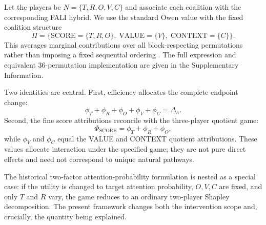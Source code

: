 Let the players be $N=\{T,R,O,V,C\}$ and associate each coalition with the corresponding FALI hybrid. We use the standard Owen value with the fixed coalition structure
\begin{equation}
\Pi=\{\mathrm{SCORE}=\{T,R,O\},\;\mathrm{VALUE}=\{V\},\;\mathrm{CONTEXT}=\{C\}\}.
\label{eq:owen-partition}
\end{equation}
This averages marginal contributions over all block-respecting permutations rather than imposing a fixed sequential ordering \citep{owen1977values}. The full expression and equivalent 36-permutation implementation are given in the Supplementary Information.

Two identities are central. First, efficiency allocates the complete endpoint change:
\begin{equation}
\phi_T+\phi_R+\phi_O+\phi_V+\phi_C=\Delta_h.
\label{eq:owen-efficiency}
\end{equation}
Second, the fine score attributions reconcile with the three-player quotient game:
\begin{equation}
\Phi_{\mathrm{SCORE}}=\phi_T+\phi_R+\phi_O,
\label{eq:quotient-consistency}
\end{equation}
while $\phi_V$ and $\phi_C$ equal the VALUE and CONTEXT quotient attributions. These values allocate interaction under the specified game; they are not pure direct effects and need not correspond to unique natural pathways.

The historical two-factor attention-probability formulation is nested as a special case: if the utility is changed to target attention probability, $O,V,C$ are fixed, and only $T$ and $R$ vary, the game reduces to an ordinary two-player Shapley decomposition. The present framework changes both the intervention scope and, crucially, the quantity being explained.
